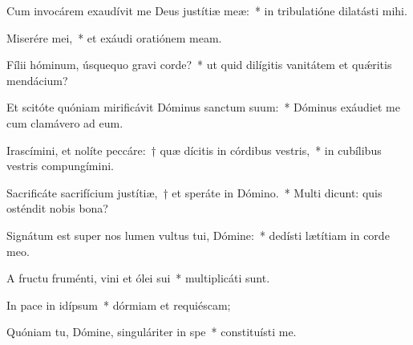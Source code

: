 \item Cum invocárem exaudívit me Deus justítiæ meæ:~* in tribulatióne dilatásti mihi.

\item Miserére mei,~* et exáudi oratiónem meam.

\item Fílii hóminum, úsquequo gravi corde?~* ut quid dilígitis vanitátem et quǽritis mendácium?

\item Et scitóte quóniam mirificávit Dóminus sanctum suum:~* Dóminus exáudiet me cum clamávero ad eum.

\item Irascímini, et nolíte peccáre:~† quæ dícitis in córdibus vestris,~* in cubílibus vestris compungímini.

\item Sacrificáte sacrifícium justítiæ,~† et speráte in Dómino.~* Multi dicunt: quis osténdit nobis bona?

\item Signátum est super nos lumen vultus tui, Dómine:~* dedísti lætítiam in corde meo.

\item A fructu fruménti, vini et ólei sui~* multiplicáti sunt.

\item In pace in idípsum~* dórmiam et requiéscam;

\item Quóniam tu, Dómine, singuláriter in spe~* constituísti me.
